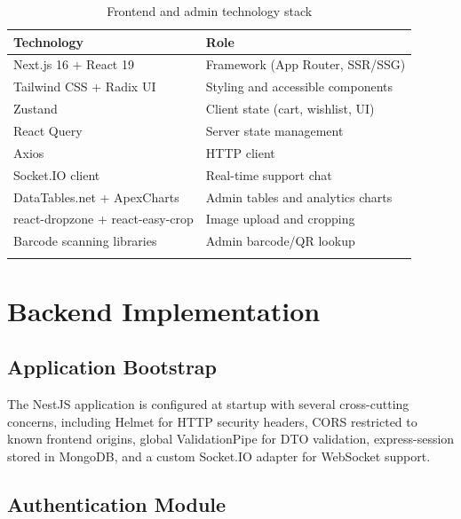 \begin{longtable}{|m{4.5cm}|m{9cm}|}
    \hline
    \textbf{Technology}              & \textbf{Role}                     \\
    \hline
    \endhead
    \endfoot
    \endlastfoot
    \hline
    Next.js 16 + React 19            & Framework (App Router, SSR/SSG)   \\
    \hline
    Tailwind CSS + Radix UI          & Styling and accessible components \\
    \hline
    Zustand                          & Client state (cart, wishlist, UI) \\
    \hline
    React Query                      & Server state management           \\
    \hline
    Axios                            & HTTP client                       \\
    \hline
    Socket.IO client                 & Real-time support chat            \\
    \hline
    DataTables.net + ApexCharts      & Admin tables and analytics charts \\
    \hline
    react-dropzone + react-easy-crop & Image upload and cropping         \\
    \hline
    Barcode scanning libraries       & Admin barcode/QR lookup           \\
    \hline
    \caption{Frontend and admin technology stack}
    \label{tab:frontend_stack}
\end{longtable}

\section{Backend Implementation}

\subsection{Application Bootstrap}

The NestJS application is configured at startup with several cross-cutting concerns,
including Helmet for HTTP security headers, CORS restricted to known frontend origins,
global ValidationPipe for DTO validation, express-session stored in MongoDB, and a
custom Socket.IO adapter for WebSocket support.

\subsection{Authentication Module}

